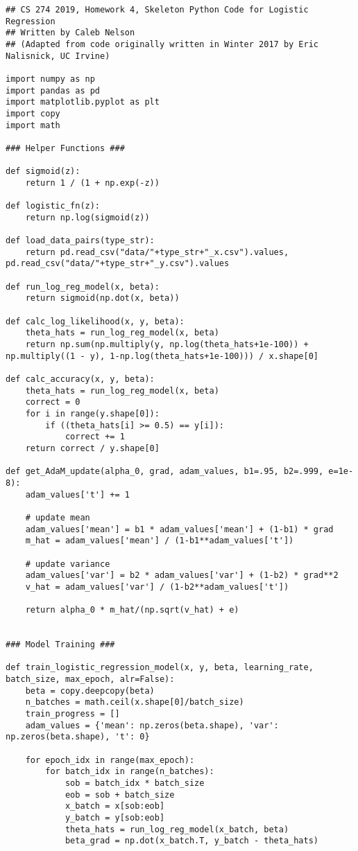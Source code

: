 \documentclass[11pt]{article}
\begin{document}
\begin{verbatim}
## CS 274 2019, Homework 4, Skeleton Python Code for Logistic Regression
## Written by Caleb Nelson
## (Adapted from code originally written in Winter 2017 by Eric Nalisnick, UC Irvine)

import numpy as np
import pandas as pd
import matplotlib.pyplot as plt
import copy
import math

### Helper Functions ###

def sigmoid(z):
    return 1 / (1 + np.exp(-z))

def logistic_fn(z):
    return np.log(sigmoid(z))

def load_data_pairs(type_str):
    return pd.read_csv("data/"+type_str+"_x.csv").values, pd.read_csv("data/"+type_str+"_y.csv").values

def run_log_reg_model(x, beta):
    return sigmoid(np.dot(x, beta))

def calc_log_likelihood(x, y, beta):
    theta_hats = run_log_reg_model(x, beta)
    return np.sum(np.multiply(y, np.log(theta_hats+1e-100)) + np.multiply((1 - y), 1-np.log(theta_hats+1e-100))) / x.shape[0]

def calc_accuracy(x, y, beta):
    theta_hats = run_log_reg_model(x, beta)
    correct = 0
    for i in range(y.shape[0]):
        if ((theta_hats[i] >= 0.5) == y[i]):
            correct += 1
    return correct / y.shape[0]

def get_AdaM_update(alpha_0, grad, adam_values, b1=.95, b2=.999, e=1e-8):
    adam_values['t'] += 1
    
    # update mean
    adam_values['mean'] = b1 * adam_values['mean'] + (1-b1) * grad
    m_hat = adam_values['mean'] / (1-b1**adam_values['t'])

    # update variance
    adam_values['var'] = b2 * adam_values['var'] + (1-b2) * grad**2
    v_hat = adam_values['var'] / (1-b2**adam_values['t'])

    return alpha_0 * m_hat/(np.sqrt(v_hat) + e)


### Model Training ###

def train_logistic_regression_model(x, y, beta, learning_rate, batch_size, max_epoch, alr=False):
    beta = copy.deepcopy(beta)
    n_batches = math.ceil(x.shape[0]/batch_size)
    train_progress = []
    adam_values = {'mean': np.zeros(beta.shape), 'var': np.zeros(beta.shape), 't': 0}

    for epoch_idx in range(max_epoch):
        for batch_idx in range(n_batches):
            sob = batch_idx * batch_size
            eob = sob + batch_size
            x_batch = x[sob:eob]
            y_batch = y[sob:eob]
            theta_hats = run_log_reg_model(x_batch, beta)
            beta_grad = np.dot(x_batch.T, y_batch - theta_hats)


\end{verbatim}
\end{document}
